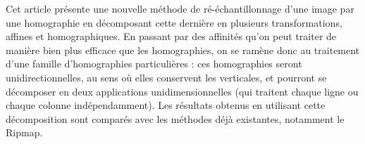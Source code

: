 
Cet article présente une nouvelle méthode de ré-échantillonnage d'une image par une homographie en décomposant cette dernière en plusieurs transformations, affines et homographiques. En passant par des affinités qu'on peut traiter de manière bien plus efficace que les homographies, on se ramène donc au traitement d'une famille d'homographies particulières : ces homographies seront unidirectionnelles, au sens où elles conservent les verticales, et pourront se décomposer en deux applications unidimensionnelles (qui traitent chaque ligne ou chaque colonne indépendamment). Les résultats obtenus en utilisant cette décomposition sont comparés avec les méthodes déjà existantes, notamment le Ripmap.
